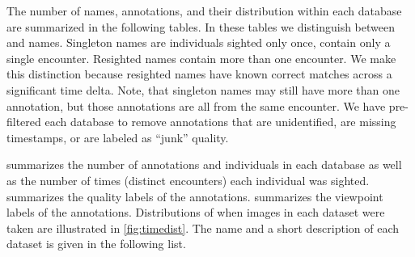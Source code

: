         \DatabaseInfo{}

        \timedist{}

        The number of names, annotations, and their distribution within each database are summarized in the
          following tables.
        In these tables we distinguish between  and  names.
        Singleton names are individuals sighted only once, \ie{} contain only a single encounter.
        Resighted names contain more than one encounter.
        We make this distinction because resighted names have known correct matches across a significant time
          delta.
        Note, that singleton names may still have more than one annotation, but those annotations are all from
          the same encounter.
        We have pre-filtered each database to remove annotations that are unidentified, are missing timestamps,
          or are labeled as ``junk'' quality.

         summarizes the number of annotations and individuals in each database as
          well as the number of times (distinct encounters) each individual was sighted.
         summarizes the quality labels of the annotations.
         summarizes the viewpoint labels of the annotations.
        Distributions of when images in each dataset were taken are illustrated in \cref{fig:timedist}.
        The name and a short description of each dataset is given in the following list.

        \FloatBarrier{}

